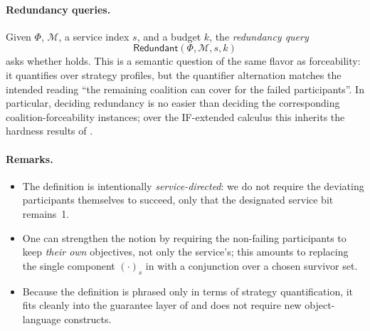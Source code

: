 \paragraph{Redundancy queries.}
Given $\Phi$, $\mathcal M$, a service index $s$, and a budget $k$, the
\emph{redundancy query}
\[
  \textsf{Redundant}(\Phi, \mathcal M, s, k)
\]
asks whether  holds. This is a semantic question of the
same flavor as forceability: it quantifies over strategy profiles, but the
quantifier alternation matches the intended reading ``the remaining coalition
can cover for the failed participants''. In particular, deciding redundancy is
no easier than deciding the corresponding coalition-forceability instances;
over the IF-extended calculus this inherits the hardness results of
.

\paragraph{Remarks.}
\begin{itemize}[nosep]
  \item The definition is intentionally \emph{service-directed}: we do not
    require the deviating participants themselves to succeed, only that the
    designated service bit remains~1.
  \item One can strengthen the notion by requiring the non-failing participants
    to keep \emph{their own} objectives, not only the service's; this amounts to
    replacing the single component $(\cdot)_s$ in
     with a conjunction over a chosen survivor set.
  \item Because the definition is phrased only in terms of strategy
    quantification, it fits cleanly into the guarantee layer of
     and does not require new object-language constructs.
\end{itemize}
